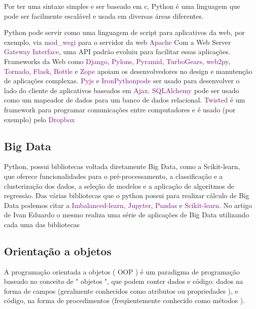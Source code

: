    Por ter uma sintaxe simples e ser baseado em c, Python é uma linguagem que pode ser facilmente escalável e usada em diversas áreas diferentes.
   
   Python pode servir como uma linguagem de script para aplicativos da web, por exemplo, via \textcolor{purple}{mod\_wsgi} para o servidor da web \textcolor{purple}{Apache} Com a Web Server \textcolor{purple}{Gateway Interface}, uma API padrão evoluiu para facilitar essas aplicações. Frameworks da Web como \textcolor{purple}{Django}, \textcolor{purple}{Pylons}, \textcolor{purple}{Pyramid}, \textcolor{purple}{TurboGears}, \textcolor{purple}{web2py}, \textcolor{purple}{Tornado}, \textcolor{purple}{Flask}, \textcolor{purple}{Bottle} e \textcolor{purple}{Zope} apoiam os desenvolvedores no design e manutenção de aplicações complexas. \textcolor{purple}{Pyjs} e \textcolor{purple}{IronPythonpode} ser usado para desenvolver o lado do cliente de aplicativos baseados em \textcolor{purple}{Ajax}. \textcolor{purple}{SQLAlchemy} pode ser usado como um mapeador de dados para um banco de dados relacional. \textcolor{purple}{Twisted}  é um framework para programar comunicações entre computadores e é usado (por exemplo) pelo \textcolor{purple}{Dropbox} \cite{Int03}


        \subsection{ Big Data}
        Python, possui bibliotecas voltada diretamente Big Data, como a Scikit-learn, que oferece funcionalidades para o pré-processamento, a classificação e a clusterização dos dados, a seleção de modelos e a aplicação de algoritmos de regressão.
        Das várias bibliotecas que o python possui para realizar cálculo de Big Data podemos citar a \textcolor{purple}{Imbalanced-learn}, \textcolor{purple}{Jupyter}, \textcolor{purple}{Pandas} e \textcolor{purple}{Scikit-learn}. No artigo de Ivan Eduardo o mesmo realiza uma série de aplicações de Big Data utilizando cada uma das bibliotecas \cite{Int04}
        
        \subsection{ Orienta\c{c}\~{a}o a objetos}
        \cite{Int05} A programação orientada a objetos ( OOP ) é um paradigma de programação baseado no conceito de " objetos ", que podem conter dados e código: dados na forma de campos (geralmente conhecidos como atributos ou propriedades ), e código, na forma de procedimentos (freqüentemente conhecido como métodos ).
        
